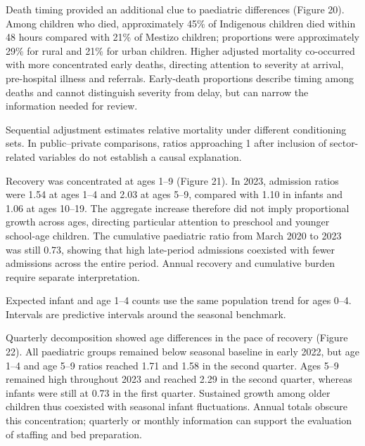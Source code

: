 \documentclass[11pt,a4paper]{article}
\newcommand{\subheading}[1]{\par\needspace{3\baselineskip}\vspace{5pt}{\bfseries #1}\par\vspace{1pt}}
\begin{document}
\subheading{Figure 20. Sequentially adjusted relative mortality ratios (left) and deaths within 48 hours as a proportion of deaths (right).}
Death timing provided an additional clue to paediatric differences (Figure 20). Among children who died, approximately 45\% of Indigenous children died within 48 hours compared with 21\% of Mestizo children; proportions were approximately 29\% for rural and 21\% for urban children. Higher adjusted mortality co-occurred with more concentrated early deaths, directing attention to severity at arrival, pre-hospital illness and referrals. Early-death proportions describe timing among deaths and cannot distinguish severity from delay, but can narrow the information needed for review.

{\small Sequential adjustment estimates relative mortality under different conditioning sets. In public–private comparisons, ratios approaching 1 after inclusion of sector-related variables do not establish a causal explanation.\par}
\subheading{Figure 21. Age-specific paediatric non-COVID ARI admissions relative to the pre-pandemic seasonal counterfactual.}
Recovery was concentrated at ages 1–9 (Figure 21). In 2023, admission ratios were 1.54 at ages 1–4 and 2.03 at ages 5–9, compared with 1.10 in infants and 1.06 at ages 10–19. The aggregate increase therefore did not imply proportional growth across ages, directing particular attention to preschool and younger school-age children. The cumulative paediatric ratio from March 2020 to 2023 was still 0.73, showing that high late-period admissions coexisted with fewer admissions across the entire period. Annual recovery and cumulative burden require separate interpretation.

{\small Expected infant and age 1–4 counts use the same population trend for ages 0–4. Intervals are predictive intervals around the seasonal benchmark.\par}
\subheading{Figure 22. Quarterly observed-to-expected non-COVID ARI admission ratios by age, 2019–2023.}
Quarterly decomposition showed age differences in the pace of recovery (Figure 22). All paediatric groups remained below seasonal baseline in early 2022, but age 1–4 and age 5–9 ratios reached 1.71 and 1.58 in the second quarter. Ages 5–9 remained high throughout 2023 and reached 2.29 in the second quarter, whereas infants were still at 0.73 in the first quarter. Sustained growth among older children thus coexisted with seasonal infant fluctuations. Annual totals obscure this concentration; quarterly or monthly information can support the evaluation of staffing and bed preparation.
\end{document}
